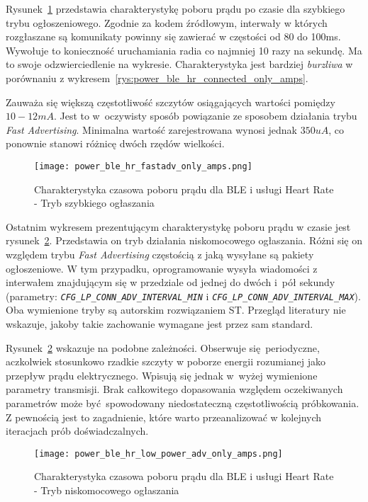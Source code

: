 Rysunek~\ref{rys:power_ble_hr_fastadv_only_amps} przedstawia charakterystykę poboru prądu po czasie
dla szybkiego trybu ogłoszeniowego. Zgodnie za kodem źródłowym, interwały w których rozgłaszane
są komunikaty powinny się zawierać w częstości od 80 do 100ms. Wywołuje to konieczność uruchamiania radia
co najmniej 10 razy na sekundę. Ma to swoje odzwierciedlenie na wykresie. Charakterystyka jest bardziej
\textit{burzliwa} w porównaniu z wykresem~\ref{rys:power_ble_hr_connected_only_amps}. 

Zauważa się większą częstotliwość szczytów osiągających wartości pomiędzy $10-12mA$. Jest to w~oczywisty
sposób powiązanie ze sposobem działania trybu \textit{Fast Advertising}. Minimalna wartość zarejestrowana wynosi jednak
$350uA$, co ponownie stanowi różnicę dwóch rzędów wielkości.

\begin{figure}[!ht]
	\centering \texttt{[image: power\_ble\_hr\_fastadv\_only\_amps.png]}
	\caption{Charakterystyka czasowa poboru prądu dla BLE i usługi Heart Rate - Tryb szybkiego ogłaszania}
	\label{rys:power_ble_hr_fastadv_only_amps}
\end{figure}

Ostatnim wykresem prezentującym charakterystykę poboru prądu w czasie jest rysunek~\ref{rys:power_ble_hr_low_power_adv_only_amps}.
Przedstawia on tryb działania niskomocowego ogłaszania. Różni się on względem trybu \textit{Fast Advertising} częstością z jaką wysyłane
są pakiety ogłoszeniowe. W tym przypadku, oprogramowanie wysyła wiadomości z interwałem znajdującym się w przedziale od 
jednej do dwóch i~pół sekundy (parametry: \textit{\texttt{CFG\_LP\_CONN\_ADV\_INTERVAL\_MIN}} i \textit{\texttt{CFG\_LP\_CONN\_ADV\_INTERVAL\_MAX}}). 
Oba wymienione tryby są autorskim rozwiązaniem ST. Przegląd literatury nie wskazuje, jakoby takie zachowanie wymagane
jest przez sam standard.

Rysunek~\ref{rys:power_ble_hr_low_power_adv_only_amps} wskazuje na podobne zależności. Obserwuje się periodyczne, aczkolwiek
stosunkowo rzadkie szczyty w poborze energii rozumianej jako przepływ prądu elektrycznego. Wpisują się jednak w~wyżej wymienione
parametry transmisji. Brak całkowitego dopasowania względem oczekiwanych parametrów może być spowodowany niedostateczną
częstotliwością próbkowania. Z pewnością jest to zagadnienie, które warto przeanalizować w kolejnych iteracjach prób doświadczalnych.


\begin{figure}[!ht]
	\centering \texttt{[image: power\_ble\_hr\_low\_power\_adv\_only\_amps.png]}
	\caption{Charakterystyka czasowa poboru prądu dla BLE i usługi Heart Rate - Tryb niskomocowego ogłaszania}
	\label{rys:power_ble_hr_low_power_adv_only_amps}
\end{figure}

